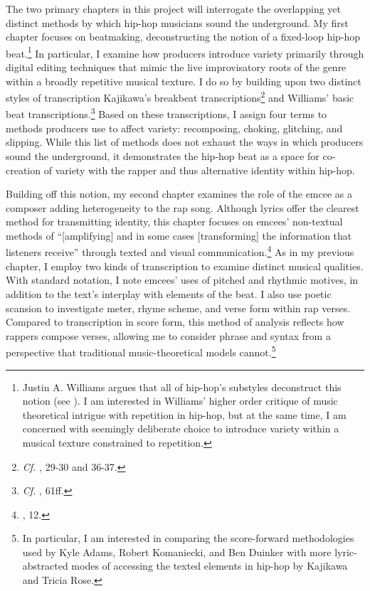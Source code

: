 The two primary chapters in this project will interrogate the overlapping yet distinct methods
by which hip-hop musicians sound the underground. My first chapter focuses on beatmaking, deconstructing 
the notion of a fixed-loop hip-hop beat.\footnote{Justin A. Williams argues that all of hip-hop's 
substyles deconstruct this notion (see \cite{justinawilliamsBeatsFlowsResponse2009}). I am interested 
in Williams' higher order critique of music theoretical intrigue with repetition in hip-hop, but at 
the same time, I am concerned with seemingly deliberate choice to introduce variety within a musical 
texture constrained to repetition.} In particular, I examine how producers introduce variety primarily
through digital editing techniques that mimic the live improvisatory roots of the genre within a broadly
repetitive musical texture. I do so by building upon two distinct styles of transcription\textemdash
Kajikawa's breakbeat  transcriptions\footnote{\textit{Cf.} \cite{lorenkajikawaSoundingRaceRap2015}, 29-30 
and 36-37.} and Williams' basic beat transcriptions.\footnote{\textit{Cf.}
\cite{justinawilliamsRhyminStealinMusical2013}, 61ff.} Based on these transcriptions, I assign four 
terms to methods producers use to affect variety: recomposing, choking, glitching, and slipping. While 
this list of methods does not exhaust the ways in which producers sound the underground, it demonstrates 
the hip-hop beat as a space for co-creation of variety with the rapper and thus alternative identity 
within hip-hop.

Building off this notion, my second chapter examines the role of the emcee as a composer 
adding heterogeneity to the rap song. Although lyrics offer the clearest method for transmitting 
identity, this chapter focuses on emcees' non-textual methods of ``[amplifying] and in some cases
[transforming] the information that listeners receive'' through texted and visual
communication.\footnote{\cite{lorenkajikawaSoundingRaceRap2015}, 12.} As in my previous chapter, I 
employ two kinds of transcription to examine distinct musical qualities. With standard notation, I 
note emcees' uses of pitched and rhythmic motives, in addition to the text's interplay with elements 
of the beat. I also use poetic scansion to investigate meter, rhyme scheme, and verse form within 
rap verses. Compared to transcription in score form, this method of analysis reflects how rappers 
compose verses, allowing me to consider phrase and syntax from a perspective that traditional 
music-theoretical models cannot.\footnote{In particular, I am interested in comparing the score-forward
methodologies used by Kyle Adams, Robert Komaniecki, and Ben Duinker with more lyric-abstracted 
modes of accessing the texted elements in hip-hop by Kajikawa and Tricia Rose.}